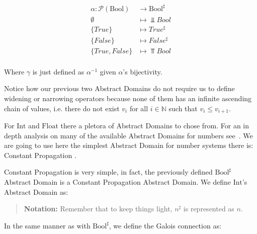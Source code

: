 \[
\begin{array}{rl}
  \alpha \colon \mathcal{P}(\text{Bool}) &\to \text{Bool}^\sharp \\
  \emptyset       & \mapsto \Bot{Bool} \\
  \{True\}        & \mapsto True^\sharp \\
  \{False\}       & \mapsto False^\sharp \\
  \{True, False\} & \mapsto \Top{Bool} \\
\end{array}
\]

Where \(\gamma{}\) is just defined as \(\alpha^{-1}\) given
\(\alpha{}\)'s bijectivity.

Notice how our previous two Abstract Domains do not require us to define widening or
narrowing operators because none of them has an infinite ascending chain of values, i.e.
there do not exist \(v_i\) for all \(i \in \mathbb{N}\) such that \(v_i \le v_{i+1}\).

For \(\text{Int}\) and \(\text{Float}\) there a pletora of Abstract Domains to chose from.
For an in depth analysis on many of the available Abstract Domains for numbers
see~\textcite{mine_weakly_2004}. We are going to use here the simplest Abstract Domain for
number systems there is: Constant Propagation \autocite{kildall_unified_1973}.

Constant Propagation is very simple, in fact, the previously defined
\(\text{Bool}^\sharp\) Abstract Domain is a Constant Propagation Abstract Domain. We
define \(\text{Int}\)'s Abstract Domain as:

\begin{center}

\end{center}


\begin{quote}
\textbf{Notation:} Remember that to keep things light, \(n^\sharp\) is represented as \(n\).
\end{quote}

In the same manner as with \(\text{Bool}^\sharp\), we define the Galois
connection as:

